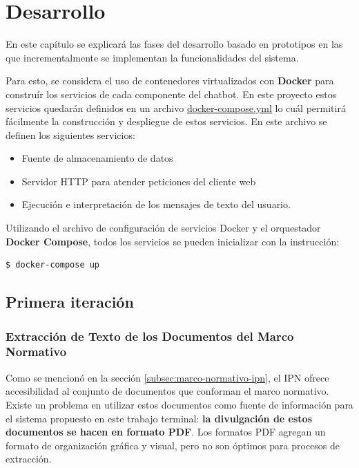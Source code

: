 \chapter{Desarrollo}

En este capítulo se explicará las fases del desarrollo basado en prototipos en las que incrementalmente se implementan la funcionalidades del sistema.

Para esto, se considera el uso de contenedores virtualizados con \textbf{Docker} para construír los servicios de cada componente del chatbot. En este proyecto estos servicios quedarán definidos en un archivo \href{https://github.com/AranGarcia/milo-bot/blob/master/docker-compose.yml}{docker-compose.yml} lo cuál permitirá fácilmente la construcción y despliegue de estos servicios. En este archivo se definen los siguientes servicios:

\begin{itemize}
    \item Fuente de almacenamiento de datos
    \item Servidor HTTP para atender peticiones del cliente web
    \item Ejecución e interpretación de los mensajes de texto del usuario.
\end{itemize}

Utilizando el archivo de configuración de servicios Docker y el orquestador \textbf{Docker Compose}, todos los servicios se pueden inicializar con la instrucción:

\begin{lstlisting}[language=bash]
  $ docker-compose up
\end{lstlisting}

\section{Primera iteración}

\subsection{Extracción de Texto de los Documentos del Marco Normativo}

Como se mencionó en la sección \ref{subsec:marco-normativo-ipn}, el IPN ofrece accesibilidad al conjunto de documentos que conforman el marco normativo. Existe un problema en utilizar estos documentos como fuente de información para el sistema propuesto en este trabajo terminal: \textbf{la divulgación de estos documentos se hacen en formato PDF}. Los formatos PDF agregan un formato de organización gráfica y visual, pero no son óptimos para procesos de extracción.


